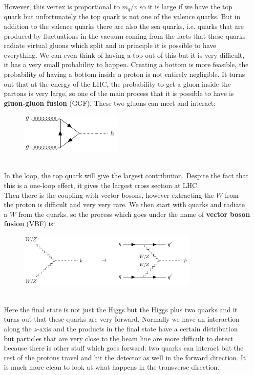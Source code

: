 \documentclass[../main.tex]{subfiles}
\begin{document}
\newpage
However, this vertex is proportional to $m_q/v$ so it is large if we have the top quark but unfortunately the top quark is not one of the valence quarks. But in addition to the valence quarks there are also the sea quarks, i.e. quarks that are produced by fluctuations in the vacuum coming from the facts that these quarks radiate  virtual gluons which split and in principle it is possible to have everything. We can even think of having a top out of this but it is very difficult, it has a very small probability to happen. Creating a bottom is more feasible, the probability of having a bottom inside a proton is not entirely negligible. It turns out that at the energy of the LHC, the probability to get a gluon inside the partons is very large, so one of the main process that it is possible to have is \textbf{gluon-gluon fusion} (GGF). These two gluons can meet and interact: 
\begin{figure}[h]
    \centering
    \includegraphics[width=0.45\textwidth]{Images/ggf.pdf}
    \caption*{}
\end{figure}\\
In the loop, the top quark will give the largest contribution. Despite the fact that this is a one-loop effect, it gives the largest cross section at LHC.\\
Then there is the coupling with vector bosons, however extracting the $W$ from the proton is difficult and very very rare. We then start with quarks and radiate a $W$ from the quarks, so the process which goes under the name of \textbf{vector boson fusion} (VBF) is:
\begin{figure}[h]
    \centering
    \includegraphics[width=0.8\textwidth]{Images/vbf.pdf}
    \caption*{}
\end{figure}\\
Here the final state is not just the Higgs but the Higgs plus two quarks and it turns out that these quarks are very forward. Normally we have an interaction along the $z$-axis and the products in the final state have a certain distribution but particles that are very close to the beam line are more difficult to detect because there is other stuff which goes forward: two quarks can interact but the rest of the protons travel and hit the detector as well in the forward direction. It is much more clean to look at what happens in the transverse direction.\\
\end{document}
